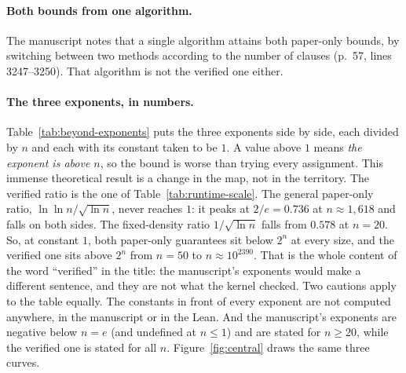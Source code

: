 \paragraph{Both bounds from one algorithm.}
The manuscript notes that a single algorithm attains both paper-only
bounds, by switching between two methods according to the number of
clauses (p.~57, lines 3247--3250). That algorithm is not the verified one
either.

\paragraph{The three exponents, in numbers.}
Table~\ref{tab:beyond-exponents} puts the three exponents side by side,
each divided by $n$ and each with its constant taken to be $1$. A value
above $1$ means \emph{the exponent is above $n$}, so the bound is worse than
trying every assignment. This immense theoretical result is a change in
the map, not in the territory. The verified ratio is the one of
Table~\ref{tab:runtime-scale}. The general paper-only ratio,
$\ln\ln n/\sqrt{\ln n}$, never reaches $1$: it peaks at $2/e = 0.736$
at $n \approx 1{,}618$ and falls on both sides. The fixed-density ratio
$1/\sqrt{\ln n}$ falls from $0.578$ at $n = 20$. So, at constant $1$,
both paper-only guarantees sit below $2^n$ at every size, and the
verified one sits above $2^n$ from $n = 50$ to $n \approx 10^{2390}$.
That is the whole content of the word ``verified'' in the title: the
manuscript's exponents would make a different sentence, and they are
not what the kernel checked. Two cautions apply to the table equally.
The constants in front of every exponent are not computed anywhere, in
the manuscript or in the Lean. And the manuscript's exponents are
negative below $n = e$ (and undefined at $n \le 1$) and are stated for $n \ge 20$, while the
verified one is stated for all $n$. Figure~\ref{fig:central} draws the
same three curves.

\begin{table}[htbp]
\centering
\caption{The three exponents of the manuscript, each divided by $n$,
with every constant taken to be $1$. A value above $1$ means the bound
is worse than trying every assignment at that $n$. Columns: the verified
$\rhon/n = (\ln\ln(n+16))^2/\sqrt{\ln(n+16)}$ (comparator lines
132--134); Theorem~1.1's general exponent $\ln\ln n/\sqrt{\ln n}$ (p.~2,
line 59); its fixed-density exponent $1/\sqrt{\ln n}$ (p.~2, line 62).
Natural logarithms throughout (p.~1, lines 48--49). The row $e^{e^2}$ is
where the general ratio peaks ($2/e$). Regenerate:
\texttt{python3 -I paper3/scripts/beyond\_claims.py}.}
\label{tab:beyond-exponents}
\small

\end{table}

